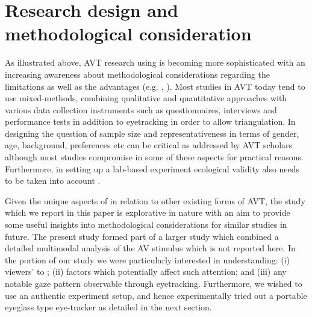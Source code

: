 \documentclass[output=paper]{langsci/langscibook}
\begin{document}
\section{Research design and methodological consideration}

As illustrated above, AVT research using  is becoming more sophisticated with an increasing awareness about methodological considerations regarding the limitations as well as the advantages (e.g. \citealt{perego2012}, \citealt{Kruger2015}). Most  studies in AVT today tend to use mixed-methods, combining qualitative and quantitative approaches with various data collection instruments such as questionnaires, interviews and performance tests in addition to eyetracking in order to allow triangulation. In designing  the question of sample size and representativeness in terms of gender, age, background, preferences etc can be critical as addressed by AVT scholars although most studies compromise in some of these aspects for practical reasons. Furthermore, in setting up a lab-based experiment ecological validity also needs to be taken into account \citep{jakobsen2014}.  


Given the unique aspects of  in relation to other existing forms of AVT, the  study which we report in this paper is explorative in nature with an aim to provide some useful insights into methodological considerations for similar studies in future. The present study formed part of a larger study which combined a detailed multimodal analysis of the AV stimulus which is not reported here. In the  portion of our study we were particularly interested in understanding: (i) viewers'  to ; (ii) factors which potentially affect such attention; and (iii) any notable gaze pattern observable through eyetracking. Furthermore, we wished to use an authentic experiment setup, and hence experimentally tried out a portable eyeglass type eye-tracker as detailed in the next section. 
\end{document}
